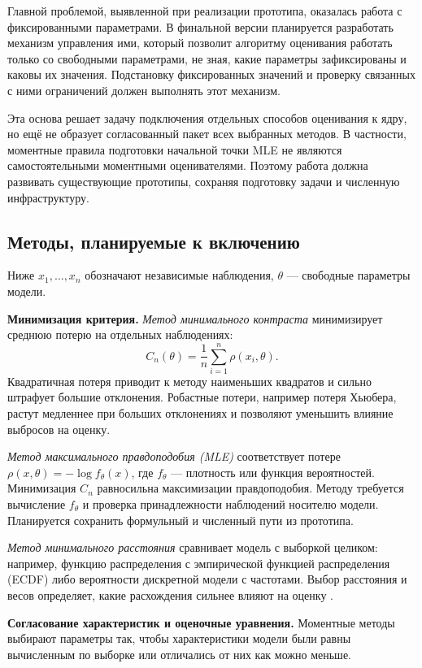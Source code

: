 Главной проблемой, выявленной при реализации прототипа, оказалась работа
с фиксированными параметрами. В финальной версии планируется разработать
механизм управления ими, который позволит алгоритму оценивания работать
только со свободными параметрами, не зная, какие параметры зафиксированы
и каковы их значения. Подстановку фиксированных значений и проверку
связанных с ними ограничений должен выполнять этот механизм.

Эта основа решает задачу подключения отдельных способов оценивания к ядру,
но ещё не образует согласованный пакет всех выбранных методов. В частности,
моментные правила подготовки начальной точки MLE не являются самостоятельными
моментными оценивателями. Поэтому работа должна развивать
существующие прототипы, сохраняя подготовку задачи и численную инфраструктуру.

\subsection{Методы, планируемые к включению}
\label{sec:methods}
Ниже $x_1,\ldots,x_n$ обозначают независимые наблюдения,
$\theta$ --- свободные параметры модели.

\textbf{Минимизация критерия.}
\emph{Метод минимального контраста} минимизирует среднюю потерю
на отдельных наблюдениях:
\[
 C_n(\theta)=\frac1n\sum_{i=1}^n\rho(x_i,\theta).
\]
Квадратичная потеря приводит к методу наименьших квадратов и сильно
штрафует большие отклонения. Робастные потери, например потеря Хьюбера,
растут медленнее при больших отклонениях и позволяют уменьшить влияние
выбросов на оценку.

\emph{Метод максимального правдоподобия (MLE)} соответствует потере
$\rho(x,\theta)=-\log f_\theta(x)$, где $f_\theta$ --- плотность или функция
вероятностей. Минимизация $C_n$ равносильна максимизации правдоподобия.
Методу требуется вычисление $f_\theta$ и проверка принадлежности наблюдений
носителю модели. Планируется сохранить формульный и численный пути
из прототипа.

\emph{Метод минимального расстояния} сравнивает модель с выборкой целиком:
например, функцию распределения с эмпирической функцией распределения
(ECDF) либо вероятности дискретной модели с частотами. Выбор расстояния
и весов определяет, какие расхождения сильнее влияют на оценку
\cite{reviewDistrMod}.

\textbf{Согласование характеристик и оценочные уравнения.}
Моментные методы выбирают параметры так, чтобы характеристики модели
были равны вычисленным по выборке или отличались от них как можно меньше.

